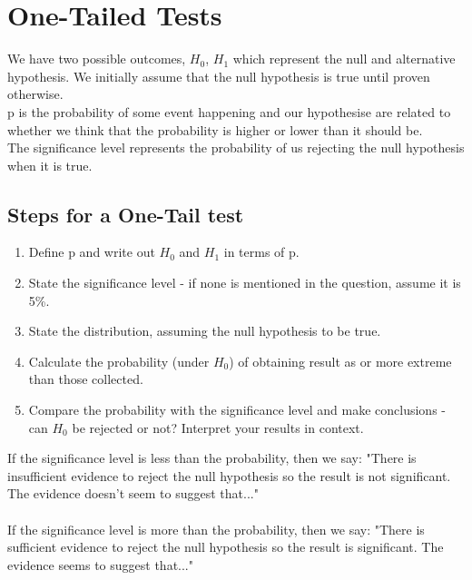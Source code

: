 \documentclass[class=article, crop=false]{standalone}
\begin{document}
\section*{One-Tailed Tests}
We have two possible outcomes, $H_0$, $H_1$ which represent the null and alternative hypothesis. We initially assume that the null hypothesis is true until proven otherwise. \\
p is the probability of some event happening and our hypothesise are related to whether we think that the probability is higher or lower than it should be. \\
The significance level represents the probability of us rejecting the null hypothesis when it is true. \\

\subsection*{Steps for a One-Tail test}
\begin{enumerate}
	\item Define p and write out $H_0$ and $H_1$ in terms of p.
	\item State the significance level - if none is mentioned in the question, assume it is 5\%.
	\item State the distribution, assuming the null hypothesis to be true.
	\item Calculate the probability (under $H_0$) of obtaining result as or more extreme than those collected. 
	\item Compare the probability with the significance level and make conclusions - can $H_0$ be rejected or not? Interpret your results in context. 
\end{enumerate}

If the significance level is less than the probability, then we say: "There is insufficient evidence to reject the null hypothesis so the result is not significant. The evidence doesn't seem to suggest that..." \\\\
	If the significance level is more than the probability, then we say: "There is sufficient evidence to reject the null hypothesis so the result is significant. The evidence seems to suggest that..." 
\end{document}
